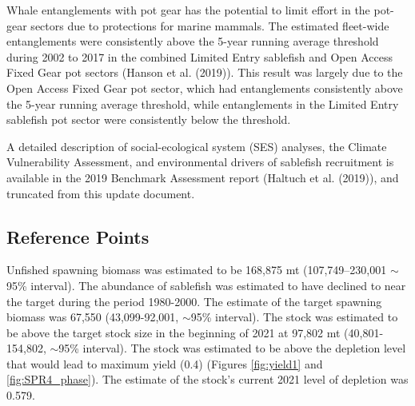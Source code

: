 \documentclass[11pt,
  english,
  a4paper,
]{article}
\begin{document}
\leavevmode\tagmcend\tagstructend\par


Whale entanglements with pot gear has the potential to limit effort in the pot-gear sectors due to protections for marine mammals. The estimated fleet-wide entanglements were consistently above the 5-year running average threshold during 2002 to 2017 in the combined Limited Entry sablefish and Open Access Fixed Gear pot sectors ({Hanson et al. (2019)\leavevmode\tagmcend\tagstructend}). This result was largely due to the Open Access Fixed Gear pot sector, which had entanglements consistently above the 5-year running average threshold, while entanglements in the Limited Entry sablefish pot sector were consistently below the threshold.

\leavevmode\tagmcend\tagstructend\par


A detailed description of social-ecological system (SES) analyses, the Climate Vulnerability Assessment, and environmental drivers of sablefish recruitment is available in the 2019 Benchmark Assessment report ({Haltuch et al. (2019)\leavevmode\tagmcend\tagstructend}), and truncated from this update document.

\leavevmode\tagmcend\tagstructend\par


\hypertarget{reference-points}{%
\subsection*{Reference Points}\label{reference-points}}

\leavevmode\tagmcend\tagstructend

Unfished spawning biomass was estimated to be 168,875 mt (107,749–230,001 $\sim$95\% interval). The abundance of sablefish was estimated to have declined to near the target during the period 1980-2000. The estimate of the target spawning biomass was 67,550 (43,099-92,001, $\sim$95\%  interval). The stock was estimated to be  above the target stock size in the beginning of 2021 at 97,802 mt (40,801-154,802, $\sim$95\% interval). The stock was estimated to be above the depletion level that would lead to maximum yield (0.4) (Figures \ref{fig:yield1} and \ref{fig:SPR4_phase}). The estimate of the stock's current 2021 level of depletion was 0.579.
\end{document}
